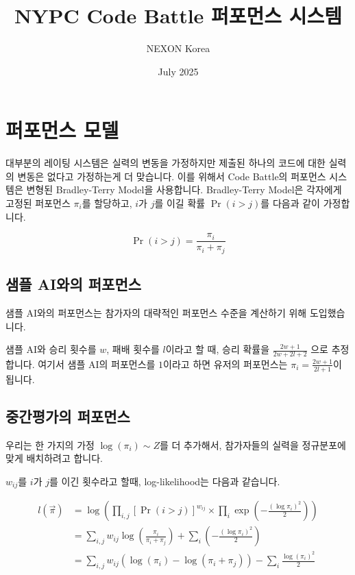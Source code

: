 \documentclass{article}
\title{NYPC Code Battle 퍼포먼스 시스템}
\author{NEXON Korea}
\date{July 2025}
\newcommand{\Prf}[1]{\Pr(#1)}
\begin{document}
\maketitle

\section{퍼포먼스 모델}

대부분의 레이팅 시스템은 실력의 변동을 가정하지만 제출된 하나의 코드에 대한 실력의 변동은 없다고 가정하는게 더 맞습니다. 이를 위해서 Code Battle의 퍼포먼스 시스템은 변형된 Bradley-Terry Model을 사용합니다. Bradley-Terry Model은 각자에게 고정된 퍼포먼스 $\pi_i$를 할당하고, $i$가 $j$를 이길 확률 $\Prf{i>j}$를 다음과 같이 가정합니다. \cite{azermelo1929}

$$\Prf{i > j} = \frac{\pi_i}{\pi_i + \pi_j} $$

\subsection{샘플 AI와의 퍼포먼스}

샘플 AI와의 퍼포먼스는 참가자의 대략적인 퍼포먼스 수준을 계산하기 위해 도입했습니다. 

샘플 AI와 승리 횟수를 $w$, 패배 횟수를 $l$이라고 할 때, 승리 확률을 $\frac{2w+1}{2w+2l+2}$ 으로 추정합니다. 여기서 샘플 AI의 퍼포먼스를 $1$이라고 하면 유저의 퍼포먼스는 $\pi_i = \frac{2w+1}{2l+1}$이 됩니다.

\subsection{중간평가의 퍼포먼스}

우리는 한 가지의 가정 $\log (\pi_i) \sim Z$를 더 추가해서, 참가자들의 실력을 정규분포에 맞게 배치하려고 합니다.


$w_{ij}$를 $i$가 $j$를 이긴 횟수라고 할때, log-likelihood는 다음과 같습니다.

\begin{align*}
l(\vec{\pi}) 
&= \log\left(
    \prod_{i,j} \left[\Prf{i > j}\right]^{w_{ij}} 
    \times \prod_i \exp\left(-\frac{(\log \pi_i)^2}{2}\right)
  \right) \\
&= \sum_{i,j} w_{ij} \log\left(\frac{\pi_i}{\pi_i + \pi_j}\right)
  + \sum_i \left(-\frac{(\log \pi_i)^2}{2}\right) \\
&= \sum_{i,j} w_{ij} \left(\log(\pi_i) - \log(\pi_i + \pi_j)\right) - \sum_i \frac{\log(\pi_i)^2}{2} 
\end{align*}
\end{document}
